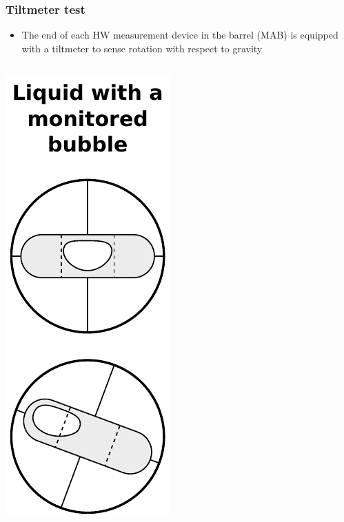 \documentclass[compress]{beamer}
\begin{document}
\begin{frame}
\frametitle{Tiltmeter test}

\begin{itemize}
\item The end of each HW measurement device in the barrel (MAB) is
  equipped with a tiltmeter to sense rotation with respect to gravity
\end{itemize}

\begin{columns}
\includegraphics[width=\linewidth]{wassermeters.pdf}


\end{columns}
\end{frame}
\end{document}
